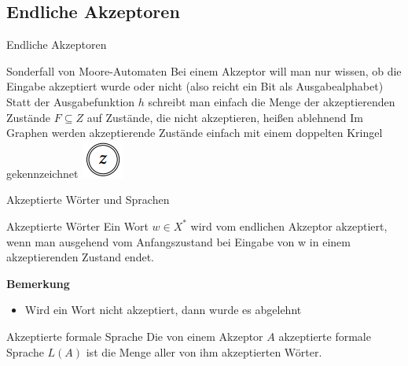 \documentclass[handout]{beamer}
\begin{document}
\subsection{Endliche Akzeptoren}
\begin{frame}{Endliche Akzeptoren}
	\begin{itemize}
		\pitem Sonderfall von Moore-Automaten
		\pitem Bei einem Akzeptor will man nur wissen, ob die Eingabe akzeptiert wurde oder nicht (also reicht ein Bit als Ausgabealphabet)
		\pitem Statt der Ausgabefunktion $h$ schreibt man einfach die Menge der akzeptierenden Zustände $F \subseteq Z$ auf
		\pitem Zustände, die nicht akzeptieren, heißen ablehnend
		\pitem Im Graphen werden akzeptierende Zustände einfach mit einem doppelten Kringel gekennzeichnet \includegraphics[scale=0.6]{images/Doppelkringel.png}
	\end{itemize}
\end{frame}

\begin{frame}{Akzeptierte Wörter und Sprachen}
	
	\begin{block}{Akzeptierte Wörter}
		Ein Wort $w \in X^*$ wird vom endlichen Akzeptor akzeptiert, wenn man ausgehend vom Anfangszustand bei Eingabe von w in einem akzeptierenden Zustand endet.
	\end{block}

	\pause
	
	\textbf{Bemerkung}\\
	\begin{itemize}
		\item Wird ein Wort nicht akzeptiert, dann wurde es abgelehnt
	\end{itemize}

	\pause
	
	\begin{block}{Akzeptierte formale Sprache}
		Die von einem Akzeptor $A$ akzeptierte formale Sprache $L(A)$ ist die Menge aller von ihm akzeptierten Wörter.
	\end{block}
\end{frame}
\end{document}
